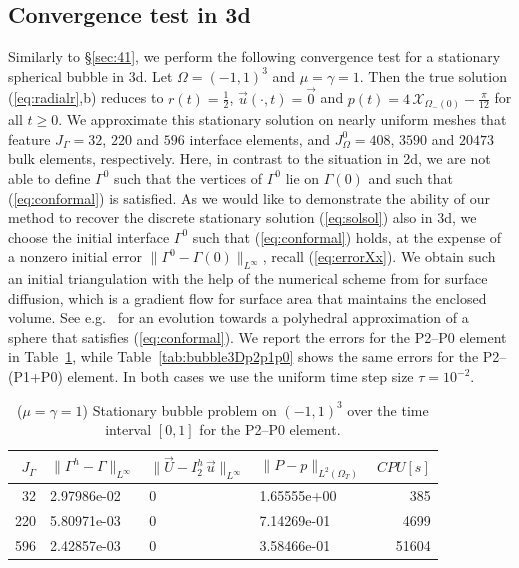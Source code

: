 \documentclass[a4paper,12pt,onecolumn]{article}
\newcommand{\bigchi}{\ensuremath{\mathrm{\mathcal{X}}}}
\newcommand{\charfcn}[1]{\bigchi_{#1}} %
\newcommand{\errorXx}{\|\Gamma^h - \Gamma\|_{L^\infty}}
\newcommand{\errorUu}[1]{\|\vec U - I^h_{#1}\,\vec u\|_{L^\infty}}
\newcommand{\LerrorPp}{\|P - p\|_{L^2(\Omega_T)}}
\begin{document}
\subsection{Convergence test in 3d} \label{sec:45}
Similarly to \S\ref{sec:41}, we perform the following convergence test for a
stationary spherical bubble in 3d. Let $\Omega = (-1,1)^3$ and 
$\mu = \gamma = 1$. 
Then the true solution (\ref{eq:radialr},b) 
reduces to $r(t) = \frac{1}{2}$, $\vec u(\cdot, t) = \vec 0$ and 
$p(t) = 4\,\charfcn{\Omega_-(0)} - \frac{\pi}{12}$ for all $t\geq0$.
We approximate this stationary solution on nearly uniform meshes that feature
$J_\Gamma = 32$, $220$ and $596$ interface elements, and
$J_\Omega^0 = 408$, $3590$ and $20473$ bulk elements, respectively.
Here, in contrast to the situation in 2d, we are not able to define $\Gamma^0$
such that the vertices of $\Gamma^0$ lie on $\Gamma(0)$ and such that
(\ref{eq:conformal}) is satisfied. As we would like to demonstrate the ability
of our method to recover the discrete stationary solution (\ref{eq:solsol})
also in 3d, we choose the initial interface $\Gamma^0$ such that 
(\ref{eq:conformal}) holds, at the expense of a nonzero initial error
$\| \Gamma^0 - \Gamma(0) \|_{L^\infty}$, recall (\ref{eq:errorXx}). 
We obtain such an initial triangulation with the help of the numerical scheme
from \cite{gflows3d} for surface diffusion, which is a gradient flow for
surface area that maintains the enclosed volume. See e.g.\ 
\cite[Fig.\ 11]{gflows3d} for an evolution towards a polyhedral approximation 
of a sphere that satisfies (\ref{eq:conformal}). 
We report the errors for the P2--P0 element in 
Table~\ref{tab:bubble3Dp2p0}, while Table~\ref{tab:bubble3Dp2p1p0} 
shows the same errors for the P2--(P1+P0) element. In both cases we use the
uniform time step size $\tau = 10^{-2}$.
\begin{table}
 \center
\begin{tabular}{rlllr}
\hline
$J_\Gamma$ & $\errorXx$ & $\errorUu2$ & $\LerrorPp$ & $CPU[s]$ \\
\hline
 32 & 2.97986e-02 & 0 & 1.65555e+00 &   385 \\
220 & 5.80971e-03 & 0 & 7.14269e-01 &  4699 \\
596 & 2.42857e-03 & 0 & 3.58466e-01 & 51604 \\
\hline
\end{tabular}
\caption{($\mu=\gamma=1$) Stationary bubble problem on $(-1,1)^3$ over the time interval $[0,1]$ for the P2--P0 element.}
\label{tab:bubble3Dp2p0}
\end{table}
\end{document}
